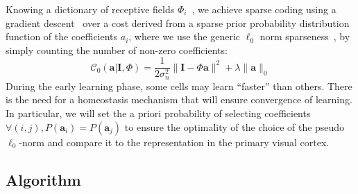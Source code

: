 \documentclass[a4paper, 11pt]{article} %
\newcommand{\coef}{\mathbf{a}} %
\newcommand{\image}{\mathbf{I}} %
\newcommand{\dico}{\Phi} %
\begin{document}

Knowing a dictionary of receptive fields $\dico_i$~\citep{hubel1968receptive}, we achieve sparse coding using a gradient descent~\citep{olshausen1996emergence,Olshausen97} over a  cost derived from a sparse prior probability distribution function of the coefficients $a_i$, where we use the generic $\ell_0$ norm sparseness~\citep{Perrinet10shl,Perrinet15bicv}, by simply counting the number of non-zero coefficients:
\begin{equation}%
\mathcal{C}_0( \coef | \image , \dico) = \frac{1}{2\sigma_n^2} \| \image - \dico \coef \|^2 + \lambda \| \coef \|_0 \nonumber%
\end{equation}%
During the early learning phase, some cells may learn ``faster'' than others. There is the need for a homeostasis mechanism that will ensure convergence of learning. In particular, we will set the a priori probability of selecting coefficients {\color{BrickRed} $\forall (i,j), P(\coef_i)=P(\coef_j)$} to ensure the optimality of the choice of the  pseudo $\ell_0$-norm and compare it to the representation in the primary visual cortex.%

\subsection{Algorithm}\label{algorithm}
\end{document}
